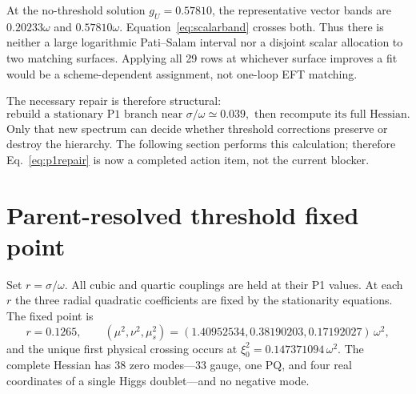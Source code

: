 \documentclass[11pt]{article}
\begin{document}
At the no-threshold solution $g_U=0.57810$, the representative vector bands
are $0.20233\omega$ and $0.57810\omega$.  Equation~\eqref{eq:scalarband}
crosses both.  Thus there is neither a large logarithmic Pati--Salam interval
nor a disjoint scalar allocation to two matching surfaces.  Applying all 29
rows at whichever surface improves a fit would be a scheme-dependent
assignment, not one-loop EFT matching.

The necessary repair is therefore structural:
\begin{equation}
 \boxed{\text{rebuild a stationary P1 branch near }
 \sigma/\omega\simeq0.039,\text{ then recompute its full Hessian.}}
 \label{eq:p1repair}
\end{equation}
Only that new spectrum can decide whether threshold corrections preserve or
destroy the hierarchy.  The following section performs this calculation;
therefore Eq.~\eqref{eq:p1repair} is now a completed action item, not the
current blocker.

\section{Parent-resolved threshold fixed point}\label{sec:fixedpoint}

Set $r=\sigma/\omega$.  All cubic and quartic couplings are held at their P1
values.  At each $r$ the three radial quadratic coefficients are fixed by the
stationarity equations.  The fixed point is
\begin{equation}
 r=0.1265,\qquad
 (\mu^2,\nu^2,\mu_s^2)=(1.40952534,0.38190203,0.17192027)\,\omega^2,
 \label{eq:fixedparameters}
\end{equation}
and the unique first physical crossing occurs at
$\xi_0^2=0.147371094\,\omega^2$.  The complete Hessian has 38 zero modes---33
gauge, one PQ, and four real coordinates of a single Higgs doublet---and no
negative mode.
\end{document}
